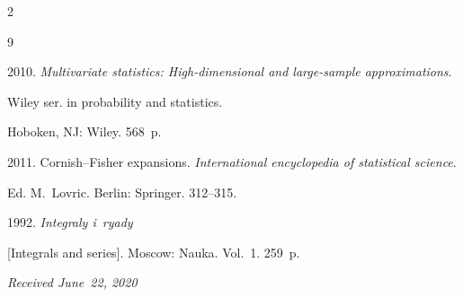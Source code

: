 \begin{multicols}{2}
{{\begin{thebibliography}{9}




 2010.  \textit{Multivariate statistics: High-dimensional and large-sample approximations}. 


 Wiley ser. in probability and statistics.


 Hoboken, NJ: Wiley. 568~p.


 






 2011.  Cornish--Fisher expansions.  \textit{International encyclopedia of statistical science}. 


 Ed. M.~Lovric. Berlin: Springer. 312--315.


 






 1992.  \textit{Integraly i~ryady} 


 [Integrals and series]. Moscow: Nauka. Vol.~1. 259~p.


 \end{thebibliography}





 }


 }





\end{multicols}





\vspace*{-3pt}





  \hfill{\small\textit{Received June~22, 2020}}


















\Contrl





